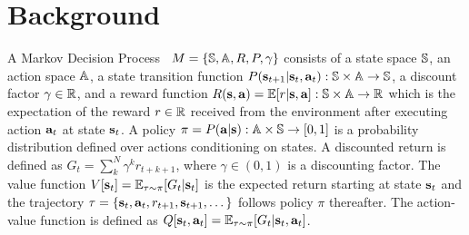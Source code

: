 \documentclass{article}
\begin{document}




\vspace{-4mm}
\section{Background}
\label{sec:background}
\vspace{-3mm}

A Markov Decision Process~\cite{puterman2014markov}
$M=\{{\mathbb{S}},{\mathbb{A}},R,P,\gamma\}$ consists of a state space ${\mathbb{S}}$, an
action space ${\mathbb{A}}$, a state transition function
$P({\mathbf{s}}_{t+1}|{\mathbf{s}}_t,{\mathbf{a}}_t): {\mathbb{S}}\times{\mathbb{A}}\rightarrow{\mathbb{S}}$, a
discount factor $\gamma\in{\mathbb{R}}$, and a reward function
$R({\mathbf{s}},{\mathbf{a}})=\mathbb{E}[r|{\mathbf{s}},{\mathbf{a}}]:{\mathbb{S}}\times{\mathbb{A}}\rightarrow{\mathbb{R}}$ which
is the expectation of the reward $r\in{\mathbb{R}}$ received from
the environment after executing action ${\mathbf{a}}_t$ at state
${\mathbf{s}}_t$. A policy
$\pi=P({\mathbf{a}}|{\mathbf{s}}):{\mathbb{A}}\times{\mathbb{S}}\rightarrow[0,1]$ is a probability
distribution defined over actions conditioning on states. A
discounted return is defined as $G_t =
\sum_k^N\gamma^kr_{t+k+1}$, where $\gamma\in (0,1)$ is a
discounting factor. The value function
$V[{\mathbf{s}}_t]=\mathbb{E}_{\tau\sim\pi}[G_t|{\mathbf{s}}_t]$ is the expected return
starting at state ${\mathbf{s}}_t$ and the trajectory
$\tau=\{{\mathbf{s}}_t,{\mathbf{a}}_t,r_{t+1},{\mathbf{s}}_{t+1},\dots\}$ follows policy
$\pi$ thereafter. The action-value function is defined as
$Q[{\mathbf{s}}_t,{\mathbf{a}}_t]= \mathbb{E}_{\tau\sim\pi}[G_t|{\mathbf{s}}_t,{\mathbf{a}}_t]$.
\end{document}
